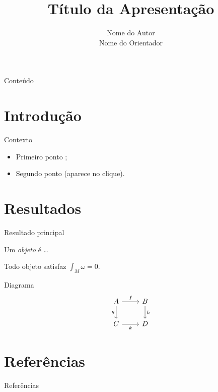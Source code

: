 \documentclass[aspectratio=169]{beamer}
\title{Título da Apresentação}
\author{\Large
  Nome do Autor\\
  Nome do Orientador\\
}
\date{}
\begin{document}
\begin{frame}[plain]
  \titlepage
\end{frame}

\begin{frame}{Conteúdo}
  \tableofcontents
\end{frame}

\section{Introdução}

\begin{frame}{Contexto}
  \begin{itemize}
    \item Primeiro ponto \parencite{doCarmo1992};
    \item<2-> Segundo ponto (aparece no clique).
  \end{itemize}
\end{frame}

\section{Resultados}

\begin{frame}{Resultado principal}
  \begin{definition}
    Um \emph{objeto} é \ldots
  \end{definition}
  \begin{theorem}
    Todo objeto satisfaz $\displaystyle\int_M \omega = 0$.
  \end{theorem}
\end{frame}

\begin{frame}[fragile]{Diagrama}  %
  \[
    \begin{tikzcd}
      A \arrow[r, "f"] \arrow[d, "g"'] & B \arrow[d, "h"] \\
      C \arrow[r, "k"'] & D
    \end{tikzcd}
  \]
\end{frame}

\section{Referências}

\begin{frame}[allowframebreaks]{Referências}
  \printbibliography[heading=none]
\end{frame}
\end{document}
